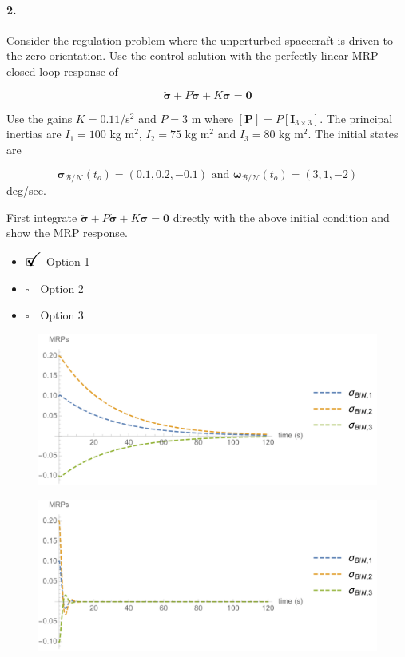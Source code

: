 \documentclass[12pt, a4paper]{article}
\newcommand{\ans}{\item[]$\rlap{\LARGE{\checkmark}}\square\quad$}
\newcommand{\noans}{\item[]$\square\quad$}
\begin{document}
\paragraph{2.}
Consider the regulation problem where the unperturbed spacecraft is driven to the zero orientation.  Use the control solution with the perfectly linear MRP closed loop response of

$$ \ddot{\bm{\sigma}} + P\dot{\bm{\sigma}} + K \bm{\sigma} = \bm{0}$$

Use the gains $K = 0.11$/s$^{2}$ and $P=3$ m where $[\bm{P}] = P[\bm{I}_{3\times3}]$. The principal inertias are $I_{1} = 100$ kg m$^{2}$, $I_{2} = 75$ kg m$^{2}$ and $I_{3} = 80$ kg m$^{2}$. The initial states are

$$\bm{\sigma}_{\mathcal{B}/\mathcal{N}}(t_{o}) = (0.1,0.2,-0.1) \text{ and } \bm{\omega}_{\mathcal{B}/\mathcal{N}}(t_{o}) = (3, 1, -2)$$ deg/sec.

First integrate $\ddot{\bm{\sigma}} + P\dot{\bm{\sigma}} + K \bm{\sigma} = \bm{0}$ directly with the above initial condition and show the MRP response.

\begin{itemize}
  \ans Option 1
  \noans Option 2
  \noans Option 3
\end{itemize}

\begin{figure}[ht]
\centering
\includegraphics[scale=0.3]{figs/fig_mrp_response_1.png}
\captionsetup{labelformat=empty}
\label{fig_mrp_response_1}
\end{figure}

\begin{figure}[ht]
\centering
\includegraphics[scale=0.3]{figs/fig_mrp_response_2.png}
\captionsetup{labelformat=empty}
\label{fig_mrp_response_2}
\end{figure}
\end{document}

